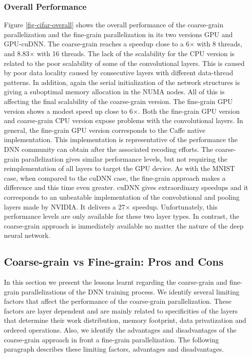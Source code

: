 \subsubsection{Overall Performance}
Figure \ref{fig-cifar-overall} shows the overall performance of
the coarse-grain parallelization and the fine-grain parallelization in
its two versions GPU and GPU-cuDNN. The coarse-grain reaches a speedup
close to a 6$\times$ with 8 threads, and 8.83$\times$ with 16 threads. The lack of
the scalability for the CPU version is related to the poor scalability
of some of the convolutional layers. This is caused by poor data locality caused by consecutive layers with different data-thread patterns. 
In addition, again the serial initialization of
the network structures is giving a suboptimal memory allocation in
the NUMA nodes. All of this is affecting the final scalability of
the coarse-grain version. The fine-grain GPU version shows a
modest speed up close to 6$\times$. Both the fine-grain GPU version and 
coarse-grain CPU version expose problems with the convolutional layers.
In general, the fine-grain GPU version corresponds to the Caffe native 
implementation. This implementation is representative of the 
performance the DNN community can obtain after the associated recoding 
efforts. The coarse-grain parallelization gives similar performance levels, but not requiring the reimplementation of all layers to target the GPU device. 
As with the MNIST case, when compared to the cuDNN case, the fine-grain 
approach makes a difference and this time even greater. cuDNN gives 
extraordinary speedups and it corresponds to an unbeatable implementation 
of the convolutional and pooling layers made by NVIDIA. It delivers a 
27$\times$ speedup. Unfortunately, this performance levels are only available 
for these two layer types. In contrast, the coarse-grain approach is 
immediately available no matter the nature of the deep neural network.

\subsection{Coarse-grain vs Fine-grain: Pros and Cons}
In this section we present the lessons learnt regarding the coarse-grain 
and fine-grain parallelizations of the DNN training process. We identify 
several limiting factors that affect the performance of the 
coarse-grain parallelization. These factors are layer dependent and are 
mainly related to specificities of the layers that determine their 
work distribution, memory footprint, data privatization and ordered 
operations. Also, we identify the advantages and disadvantages of 
the coarse-grain approach in front a fine-grain parallelization. 
The following paragraph describes these limiting factors, 
advantages and disadvantages.

